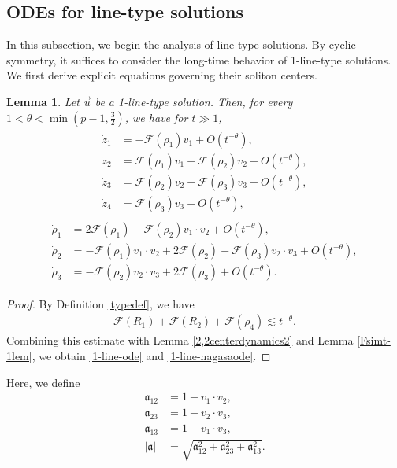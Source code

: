 \documentclass[10pt,a4paper]{amsart}
\newtheorem{lemma}[theorem]{Lemma}
\numberwithin{equation}{section}
\begin{document}
\subsection{ODEs for line-type solutions}

In this subsection, we begin the analysis of line-type solutions. By cyclic symmetry, it suffices to consider the long-time behavior of 1-line-type solutions. We first derive explicit equations governing their soliton centers.


\begin{lemma}\label{1-type-ode}
Let $\vec{u}$ be a 1-line-type solution. Then, for every $1<\theta<\min{(p-1,\frac{3}{2})}$, we have for $t\gg 1$,
\begin{align}\label{1-line-ode}
\begin{aligned}
\dot{z}_1&=-\mathcal{F}(\rho_1)v_1+O\left(t^{-\theta}\right),
\\
\dot{z}_2&=\mathcal{F}(\rho_1)v_1-\mathcal{F}(\rho_2)v_2+O\left(t^{-\theta}\right),
\\
\dot{z}_3&=\mathcal{F}(\rho_2)v_2-\mathcal{F}(\rho_3)v_3+O\left(t^{-\theta}\right),
\\
\dot{z}_4&=\mathcal{F}(\rho_3)v_3+O\left(t^{-\theta}\right),
\end{aligned}
\end{align}
\begin{align}\label{1-line-nagasaode}
\begin{aligned}
\dot{\rho}_1&=2\mathcal{F}(\rho_1)-\mathcal{F}(\rho_2)v_1\cdot v_2+O\left(t^{-\theta}\right),
\\
\dot{\rho}_2&=-\mathcal{F}(\rho_1)v_1\cdot v_2+2\mathcal{F}(\rho_2)-\mathcal{F}(\rho_3)v_2\cdot v_3+O\left(t^{-\theta}\right),
\\
\dot{\rho}_3&=-\mathcal{F}(\rho_2)v_2\cdot v_3+2\mathcal{F}(\rho_3)+O\left(t^{-\theta}\right).
\end{aligned}
\end{align}
\end{lemma}
\begin{proof}
By Definition \ref{typedef}, we have
\begin{align*}
\mathcal{F}(R_1)+\mathcal{F}(R_2)+\mathcal{F}(\rho_4)\lesssim t^{-\theta}.
\end{align*}
Combining this estimate with Lemma \ref{2,2centerdynamics2} and Lemma \ref{Fsimt-1lem}, we obtain \eqref{1-line-ode} and \eqref{1-line-nagasaode}.
\end{proof}

Here, we define 
\begin{align*}
\mathfrak{a}_{12}&=1-v_1\cdot v_2,
\\
\mathfrak{a}_{23}&=1-v_2\cdot v_3,
\\
\mathfrak{a}_{13}&=1-v_1\cdot v_3,
\\
|\mathfrak{a}|&=\sqrt{\mathfrak{a}_{12}^2+\mathfrak{a}_{23}^2+\mathfrak{a}_{13}^2}.
\end{align*}
\end{document}
